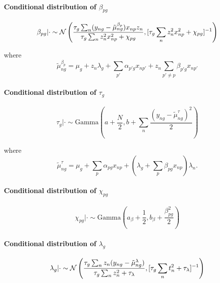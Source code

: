 \paragraph{Conditional distribution of $\beta_{pg}$}
\begin{equation}
\beta_{pg} | \cdot \sim \mathcal{N} \left( \frac{
\tau_g \sum_n (y_{ng} - \tilde{\mu}_{ng}^{\beta_p})x_{np} z_n
}{\tau_g \sum_n z_n^2 x_{np}^2 + \chi_{pg}},
[\tau_g \sum_n z_n^2 x_{np}^2 + \chi_{pg}]^{-1} \right)
\end{equation}

where
\begin{equation}
\tilde{\mu}_{ng}^{\beta_p} = \mu_g + z_n \lambda_g  +
\sum_{p'} \alpha_{p'g} x_{np'} + z_n \sum_{p' \neq p} \beta_{p'g} x_{np'}
\end{equation}

\paragraph{Conditional distribution of $\tau_g$}
\begin{equation}
\tau_g | \cdot \sim \text{Gamma}\left(
a + \frac{N}{2}, b + \sum_n \frac{(y_{ng} - \tilde{\mu}^\tau_{ng})^2}{2}
\right)
\end{equation}

where
\begin{equation}
\tilde{\mu}^\tau_{ng} = \mu_g + \sum_p \alpha_{pg} x_{np} + \left( \lambda_g + \sum_p \beta_{pg} x_{np} \right) \lambda_n.
\end{equation}

\paragraph{Conditional distribution of $\chi_{pg}$}
\begin{equation}
\chi_{pg} | \cdot \sim \text{Gamma}\left( a_\beta + \frac{1}{2}, b_\beta + \frac{\beta_{pg}^2}{2}\right)
\end{equation}

\paragraph{Conditional distribution of $\lambda_g$}
\begin{equation}
\lambda_g | \cdot \sim \mathcal{N}\left(
\frac{\tau_g \sum_n z_n(y_{ng} - \tilde{\mu}^\lambda_{ng})}{\tau_g \sum_n z_n^2 + \tau_\lambda},
[\tau_g \sum_n t_n^2 + \tau_\lambda]^{-1}
\right)
\end{equation}

